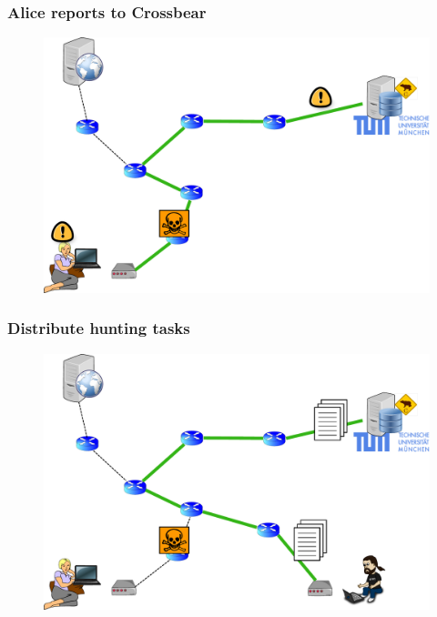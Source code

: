 \begin{frame}
  \frametitle{Alice reports to Crossbear}
  \begin{block}{}
    \vskip -1.2cm
    \begin{figure}[t]
      \centering
      \includegraphics[scale=.36]{figures/reporting-7-huntingreport}
    \end{figure}
  \end{block}
\end{frame}

\begin{frame}
  \frametitle{Distribute hunting tasks}
  \begin{block}{}
    \vskip -1.2cm
    \begin{figure}[t]
      \centering
      \includegraphics[scale=.36]{figures/hunting-1-polling}
    \end{figure}
  \end{block}
\end{frame}

